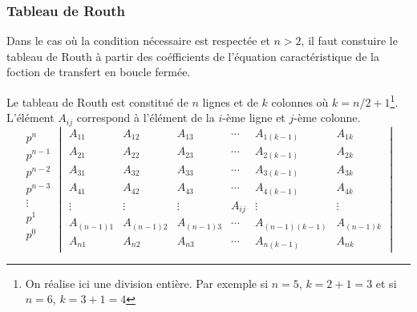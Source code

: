 \subsubsection{Tableau de Routh}
Dans le cas où la condition nécessaire est respectée et $n>2$, il faut constuire le tableau de Routh à partir 
des coéfficients de l'équation caractéristique de la foction de transfert en boucle fermée.

Le tableau de Routh est constitué de $n$ lignes et de $k$ colonnes 
où $k=n/2+1$\footnote{On réalise ici une division entière. Par exemple 
si $n=5$, $k=2+1=3$ et si $n=6$, $k=3+1=4$}. L'élément $A_{ij}$ correspond 
à l'élément de la $i$-ème ligne et $j$-ème colonne.
\[
\begin{matrix}
    p^n    \\
    p^{n-1}\\
    p^{n-2}\\
    p^{n-3}\\
    \vdots \\
    p^1    \\
    p^0    \\
\end{matrix}
\begin{vmatrix}
    A_{11}     & A_{12}     & A_{13}     & \cdots & A_{1(k-1)}     & A_{1k}      \\
    A_{21}     & A_{22}     & A_{23}     & \cdots & A_{2(k-1)}     & A_{2k}      \\
    A_{31}     & A_{32}     & A_{33}     & \cdots & A_{3(k-1)}     & A_{3k}      \\
    A_{41}     & A_{42}     & A_{43}     & \cdots & A_{4(k-1)}     & A_{4k}      \\
    \vdots     & \vdots     & \vdots     & A_{ij} & \vdots         & \vdots      \\
    A_{(n-1)1} & A_{(n-1)2} & A_{(n-1)3} & \cdots & A_{(n-1)(k-1)} & A_{(n-1)k}  \\
    A_{n1}     & A_{n2}     & A_{n3}     & \cdots & A_{n(k-1)}     & A_{nk}
\end{vmatrix}
\]

